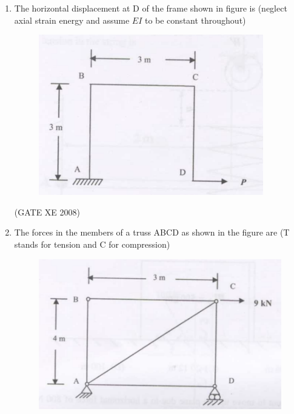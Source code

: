 \documentclass[12pt]{article}
\begin{document}
\begin{enumerate}
\begin{enumerate}
\end{enumerate}
    
    (GATE XE 2008)  


    \item The horizontal displacement at D of the frame shown in figure is (neglect axial strain energy and assume $EI$ to be constant throughout) 

    \begin{figure}[H]
    \centering
    \includegraphics[width=0.5\columnwidth]{figs/ass1_f_q23.png}
    \caption{}
    \end{figure}

\begin{enumerate}
\end{enumerate}
    
    (GATE XE 2008)  

    \item The forces in the members of a truss ABCD as shown in the figure are (T stands for tension and C for compression)  

    \begin{figure}[H]
    \centering
    \includegraphics[width=0.5\columnwidth]{figs/ass1_f_q24.png}
    \caption{}
    \end{figure}


\end{enumerate}
\end{document}
